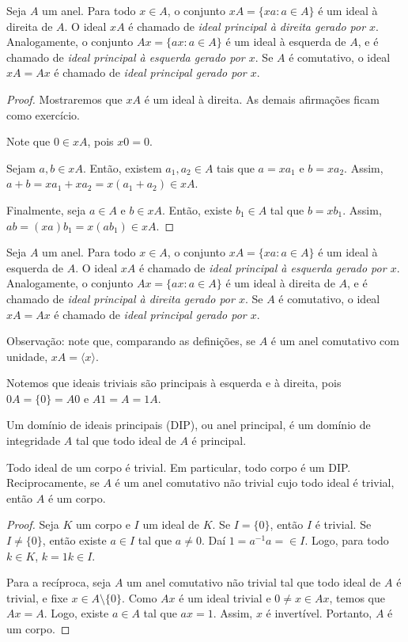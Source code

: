 \begin{prop}
    Seja $A$ um anel. Para todo $x \in A$, o conjunto $xA=\{xa:a \in A\}$ é um ideal à direita de $A$. O ideal $xA$ é chamado de \emph{ideal principal à direita gerado por $x$}.
    Analogamente, o conjunto $Ax=\{ax:a \in A\}$ é um ideal à esquerda de $A$, e é chamado de \emph{ideal principal à esquerda gerado por $x$}.
    Se $A$ é comutativo, o ideal $xA=Ax$ é chamado de \emph{ideal principal gerado por $x$}.
\end{prop}
\begin{proof}
Mostraremos que $xA$ é um ideal à direita. As demais afirmações ficam como exercício.

Note que $0 \in xA$, pois $x0=0$.

Sejam $a, b \in xA$. Então, existem $a_1, a_2 \in A$ tais que $a=xa_1$ e $b=xa_2$. Assim, $a+b=xa_1+xa_2=x(a_1+a_2) \in xA$.

Finalmente, seja $a \in A$ e $b \in xA$. Então, existe $b_1 \in A$ tal que $b=xb_1$. Assim, $ab=(xa)b_1=x(ab_1) \in xA$.
\end{proof}
\begin{definition}
    Seja $A$ um anel. Para todo $x \in A$, o conjunto $xA=\{xa:a \in A\}$ é um ideal à esquerda de $A$. O ideal $xA$ é chamado de \emph{ideal principal à esquerda gerado por $x$}.
    Analogamente, o conjunto $Ax=\{ax:a \in A\}$ é um ideal à direita de $A$, e é chamado de \emph{ideal principal à direita gerado por $x$}.
    Se $A$ é comutativo, o ideal $xA=Ax$ é chamado de \emph{ideal principal gerado por $x$}.
\end{definition}

Observação: note que, comparando as definições, se $A$ é um anel comutativo com unidade, $xA=\langle x\rangle$.

Notemos que ideais triviais são principais à esquerda e à direita, pois $0A=\{0\}=A0$ e $A1=A=1A$.

\begin{definition}
    Um domínio de ideais principais (DIP), ou anel principal, é um domínio de integridade $A$ tal que todo ideal de $A$ é principal.
\end{definition}

\begin{prop}
    Todo ideal de um corpo é trivial. Em particular, todo corpo é um DIP. Reciprocamente, se $A$ é um anel comutativo não trivial cujo todo ideal é trivial, então $A$ é um corpo.
\end{prop}
\begin{proof}
Seja $K$ um corpo e $I$ um ideal de $K$. Se $I=\{0\}$, então $I$ é trivial. Se $I\neq \{0\}$, então existe $a \in I$ tal que $a \neq 0$. Daí $1=a^{-1}a=\in I$. Logo, para todo $k \in K$, $k=1k\in I$.

Para a recíproca, seja $A$ um anel comutativo não trivial tal que todo ideal de $A$ é trivial, e fixe $x \in A\setminus \{0\}$. Como $Ax$ é um ideal trivial e $0\neq x \in Ax$, temos que $Ax=A$. Logo, existe $a \in A$ tal que $ax=1$. Assim, $x$ é invertível. Portanto, $A$ é um corpo.
\end{proof}

